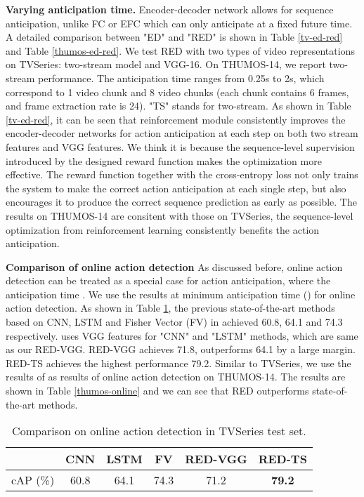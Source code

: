 \documentclass{bmvc2k}
\begin{document}
\textbf{Varying anticipation time.} Encoder-decoder network allows for sequence anticipation, unlike FC or EFC which can only anticipate at a fixed future time. A detailed comparison between "ED" and "RED" is shown in Table \ref{tv-ed-red} and Table \ref{thumos-ed-red}. We test RED with two types of video representations on TVSeries: two-stream model and VGG-16. On THUMOS-14, we report two-stream performance. The anticipation time ranges from 0.25s to 2s, which correspond to 1 video chunk and 8 video chunks (each chunk contains 6 frames, and frame extraction rate is 24). "TS" stands for two-stream. As shown in Table \ref{tv-ed-red}, it can be seen that reinforcement module consistently improves the encoder-decoder networks for action anticipation at each step on both two stream features and VGG features. We think it is because the sequence-level supervision introduced by the designed reward function makes the optimization more effective. The reward function together with the cross-entropy loss not only trains the system to make the correct action anticipation at each single step, but also encourages it to produce the correct sequence prediction as early as possible. The results on THUMOS-14 are consitent with those on TVSeries, the sequence-level optimization from reinforcement learning consistently benefits the action anticipation.




\textbf{Comparison of online action detection}
As discussed before, online action detection can be treated as a special case for action anticipation, where the anticipation time . We use the results at minimum anticipation time () for online action detection. As shown in Table \ref{tv-online}, the previous state-of-the-art methods based on CNN, LSTM and Fisher Vector (FV) in \cite{de2016online} achieved 60.8, 64.1 and 74.3 respectively. \cite{de2016online} uses VGG features for "CNN" and "LSTM" methods, which are same as our RED-VGG. RED-VGG achieves 71.8, outperforms 64.1 by a large margin. RED-TS achieves the highest performance 79.2. Similar to TVSeries, we use the results of  as results of online action detection on THUMOS-14. The results are shown in Table \ref{thumos-online} and we can see that RED outperforms state-of-the-art methods. 



\begin{table}[h]
\centering
\caption{Comparison on online action detection in TVSeries test set. }
\label{tv-online}
\begin{tabular}{l|ccc|cc}
\hline
    & CNN\cite{de2016online} & LSTM\cite{de2016online} &FV \cite{de2016online} & RED-VGG & RED-TS \\ \hline
cAP (\%) &  60.8  &   64.1   &  74.3  &  71.2 &\textbf{79.2}   \\ \hline
\end{tabular}
\end{table}
\end{document}
